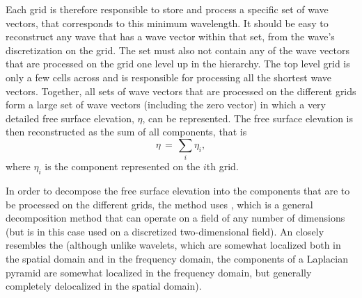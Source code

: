 Each grid is therefore responsible to store and process a specific set of wave vectors, that corresponds to this minimum wavelength. It should be easy to reconstruct any wave that has a wave vector within that set, from the wave's discretization on the grid. The set must also not contain any of the wave vectors that are processed on the grid one level up in the hierarchy. The top level grid is only a few cells across and is responsible for processing all the shortest wave vectors. Together, all sets of wave vectors that are processed on the different grids form a large set of wave vectors (including the zero vector) in which a very detailed free surface elevation, $\eta$, can be represented. The free surface elevation is then reconstructed as the sum of all components, that is
%
\begin{equation} \label{eq:laplacian_pyramid_composition}
\eta \,=\, \sum_i \eta_i,
\end{equation}
%
where $\eta_i$ is the component represented on the $i$th grid.

In order to decompose the free surface elevation into the components that are to be processed on the different grids, the method uses \LPD, which is a general decomposition method that can operate on a field of any number of dimensions (but is in this case used on a discretized two-dimensional field). An \LPD closely resembles the  (although unlike wavelets, which are somewhat localized both in the spatial domain and in the frequency domain, the components of a Laplacian pyramid are somewhat localized in the frequency domain, but generally completely delocalized in the spatial domain).

